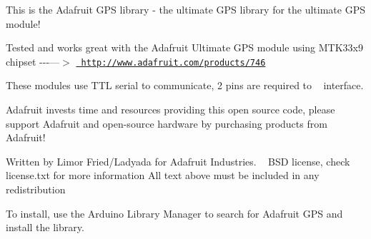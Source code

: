 This is the Adafruit GPS library -\/ the ultimate GPS library for the ultimate GPS module!

Tested and works great with the Adafruit Ultimate GPS module using MTK33x9 chipset -\/-\/-\/---\texorpdfstring{$>$}{>} \href{http://www.adafruit.com/products/746}{\texttt{ http\+://www.\+adafruit.\+com/products/746}}

These modules use TTL serial to communicate, 2 pins are required to ~\newline
 interface.

Adafruit invests time and resources providing this open source code, please support Adafruit and open-\/source hardware by purchasing products from Adafruit!

Written by Limor Fried/\+Ladyada for Adafruit Industries. ~\newline
 BSD license, check license.\+txt for more information All text above must be included in any redistribution

To install, use the Arduino Library Manager to search for \textquotesingle{}Adafruit GPS\textquotesingle{} and install the library. 